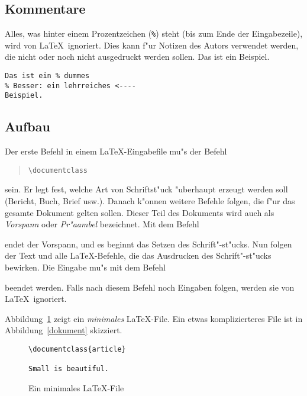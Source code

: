 \subsection{Kommentare}
 
Alles, was hinter einem Prozentzeichen (\verb|%|)
steht (bis zum Ende der Eingabezeile), wird von \LaTeX\ 
ignoriert.
Dies kann f"ur Notizen des Autors verwendet werden, die nicht
oder noch nicht ausgedruckt werden sollen.
\exa
Das ist ein %
Beispiel.
\exb
\begin{verbatim}
Das ist ein % dummes
% Besser: ein lehrreiches <----
Beispiel.
\end{verbatim}
\exc
 
\subsection{Aufbau}
 
Der erste Befehl in einem \LaTeX-Eingabefile mu"s der Befehl
\begin{quote}
\verb|\documentclass|
\end{quote}
sein.
Er legt fest, welche Art von Schriftst"uck "uberhaupt erzeugt werden soll
(Bericht, Buch, Brief usw.).
Danach k"onnen weitere Befehle folgen, die f"ur das gesamte
Dokument gelten sollen.  Dieser Teil des Dokuments wird auch als 
\emph{Vorspann} oder \emph{Pr"aambel} bezeichnet.  Mit dem Befehl
\begin{quote}
\verb||
\end{quote}
endet der Vorspann, und es 
beginnt das Setzen des Schrift"-st"ucks.
Nun folgen der Text und alle \LaTeX-Befehle, die das Ausdrucken
des Schrift"-st"ucks bewirken.
Die Eingabe mu"s mit dem Befehl
\begin{quote}
\verb||
\end{quote}
beendet werden.
Falls nach diesem Befehl noch Eingaben folgen, werden sie von
\LaTeX\ ignoriert.
 
Abbildung~\ref{mini} zeigt ein \emph{minimales} \LaTeX-File.
Ein etwas komplizierteres File ist in Abbildung~\ref{dokument}
skizziert.
 
\begin{figure}[hbp] %
\oben{6cm}
\begin{verbatim}
\documentclass{article}

Small is beautiful.

\end{verbatim}
\unten
\caption{Ein minimales \LaTeX-File} \label{mini}
\end{figure}

